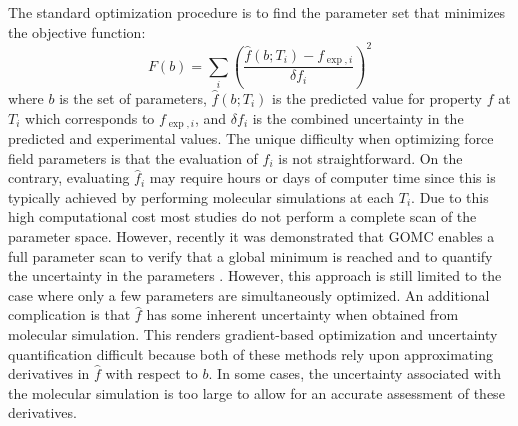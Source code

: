 \documentclass[12pt]{article}
\begin{document}
The standard optimization procedure is to find the parameter set that minimizes the objective function:
\begin{equation} \label{Objective}
F(b) = \sum_{i} \left(\frac{\hat{f}(b;T_i) - f_{\exp,i}}{\delta f_{i}}\right)^2
\end{equation}
where $b$ is the set of parameters, $\hat{f}(b;T_i)$ is the predicted value for property $f$ at $T_i$ which corresponds to $f_{\exp,i}$, and $\delta f_{i}$ is the combined uncertainty in the predicted and experimental values. The unique difficulty when optimizing force field parameters is that the evaluation of $\hat{f}_i$ is not straightforward. On the contrary, evaluating $\hat{f}_i$ may require hours or days of computer time since this is typically achieved by performing molecular simulations at each $T_i$. Due to this high computational cost most studies do not perform a complete scan of the parameter space. However, recently it was demonstrated that GOMC enables a full parameter scan to verify that a global minimum is reached and to quantify the uncertainty in the parameters \cite{GOMC}. However, this approach is still limited to the case where only a few parameters are simultaneously optimized. An additional complication is that $\hat{f}$ has some inherent uncertainty when obtained from molecular simulation. This renders gradient-based optimization and uncertainty quantification difficult because both of these methods rely upon approximating derivatives in $\hat{f}$ with respect to $b$. In some cases, the uncertainty associated with the molecular simulation is too large to allow for an accurate assessment of these derivatives.

\end{document}
